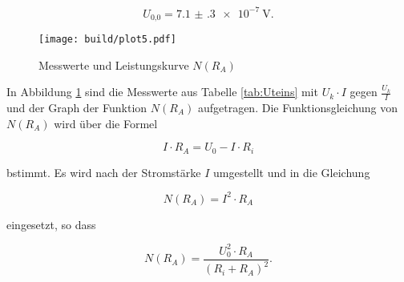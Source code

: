   \begin{equation}
    U_\text{0,0} = \SI{7.1(3)e-7}{\V}.
  \end{equation}

  \newpage

  \begin{figure}[h]
    \texttt{[image: build/plot5.pdf]}
    \caption{Messwerte und Leistungskurve $N(R_A)$}
    \label{fig:U5}
  \end{figure}

  In Abbildung \ref{fig:U5} sind die Messwerte aus Tabelle \ref{tab:Uteins}
  mit $U_k \cdot I$ gegen $\frac{U_k}{I}$ und der Graph der Funktion $N(R_A)$
  aufgetragen. Die Funktionsgleichung von $N(R_A)$ wird über die Formel

  \begin{equation}
    I \cdot R_A = U_0 - I \cdot R_i
  \end{equation}

  bstimmt. Es wird nach der Stromstärke $I$ umgestellt und in die Gleichung

  \begin{equation}
    N(R_A) = I^2 \cdot R_A
  \end{equation}

  eingesetzt, so dass

  \begin{equation}
    N(R_A) = \frac{U_0^2 \cdot R_A}{(R_i + R_A)^2}.
  \end{equation}
